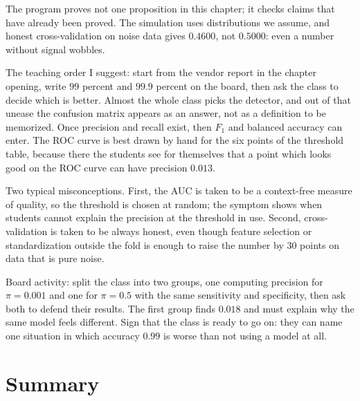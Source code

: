 The program proves not one proposition in this chapter; it checks claims that have already been
proved. The simulation uses distributions we assume, and honest cross-validation on noise data
gives $0.4600$, not $0.5000$: even a number without signal wobbles.

\begin{untukdosen}
The teaching order I suggest: start from the vendor report in the chapter opening, write $99$
percent and $99.9$ percent on the board, then ask the class to decide which is better. Almost the
whole class picks the detector, and out of that unease the confusion matrix appears as an answer,
not as a definition to be memorized. Once precision and recall exist, then $F_1$ and balanced
accuracy can enter. The ROC curve is best drawn by hand for the six points of the threshold table,
because there the students see for themselves that a point which looks good on the ROC curve can
have precision $0.013$.

Two typical misconceptions. First, the AUC is taken to be a context-free measure of quality, so the
threshold is chosen at random; the symptom shows when students cannot explain the precision at the
threshold in use. Second, cross-validation is taken to be always honest, even though feature
selection or standardization outside the fold is enough to raise the number by $30$ points on data
that is pure noise.

Board activity: split the class into two groups, one computing precision for $\pi=0.001$ and one
for $\pi=0.5$ with the same sensitivity and specificity, then ask both to defend their results. The
first group finds $0.018$ and must explain why the same model feels different. Sign that the class
is ready to go on: they can name one situation in which accuracy $0.99$ is worse than not using a
model at all.
\end{untukdosen}

\section{Summary}

